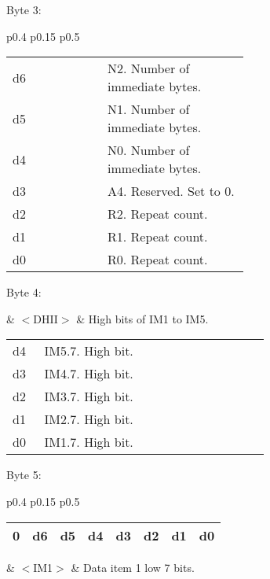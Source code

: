 Byte 3:

\begin{tabular}{p{0.4\linewidth} p{0.15\linewidth} p{0.5\linewidth}} 

\begin{tabular}{|p{0.3cm}|p{0.3cm}|p{0.3cm}|p{0.3cm}|p{0.3cm}|p{0.3cm}|p{0.3cm}|p{0.3cm}|}
\hline
0 & d6 & d5 & d4 & d3 & d2 & d1 & d0\\
\hline
\end{tabular}
& $<$REPS$>$ & Number of immediate bytes and repeat count.
\end{tabular}

\begin{tabular}{p{0.05\linewidth} p{0.6\linewidth}} 
d6 & N2. Number of immediate bytes.\\
d5 & N1. Number of immediate bytes.\\
d4 & N0. Number of immediate bytes.\\
d3 & A4. Reserved. Set to 0.\\
d2 & R2. Repeat count.\\
d1 & R1. Repeat count.\\
d0 & R0. Repeat count.\\
\end{tabular}

Byte 4:

& $<$DHII$>$ & High bits of IM1 to IM5.
\end{tabular}

\begin{tabular}{p{0.05\linewidth} p{0.6\linewidth}} 
d4 & IM5.7. High bit.\\
d3 & IM4.7. High bit.\\
d2 & IM3.7. High bit.\\
d1 & IM2.7. High bit.\\
d0 & IM1.7. High bit.\\
\end{tabular}

Byte 5:

\begin{tabular}{p{0.4\linewidth} p{0.15\linewidth} p{0.5\linewidth}} 

\begin{tabular}{|p{0.3cm}|p{0.3cm}|p{0.3cm}|p{0.3cm}|p{0.3cm}|p{0.3cm}|p{0.3cm}|p{0.3cm}|}
\hline
0 & d6 & d5 & d4 & d3 & d2 & d1 & d0\\
\hline
\end{tabular}
& $<$IM1$>$ & Data item 1 low 7 bits.
\end{tabular}

